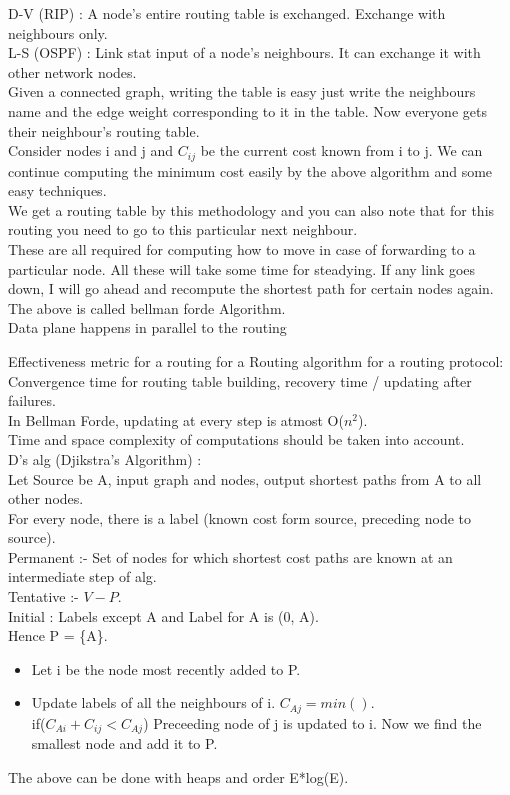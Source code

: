 \documentclass[solution,addpoints,12pt]{exam}
\begin{document}
D-V (RIP) : A node's entire routing table is exchanged. Exchange with
neighbours only.\\
L-S (OSPF) : Link stat input of a node's neighbours. It can exchange it
with other network nodes.\\
Given a connected graph, writing the table is easy
just write the neighbours name and the edge weight corresponding to
it in the table. Now everyone gets their neighbour's routing table.\\
Consider nodes i and j and $C_{ij}$ be the current cost known from i to j.
We can continue computing the minimum cost easily by the above algorithm
and some easy techniques.\\
We get a routing table by this methodology and you can also
note that for this routing you need to go to this particular next neighbour.\\
These are all required for computing how to move in case of forwarding to
a particular node. All these will take some time for steadying. If any link
goes down, I will go ahead and recompute the shortest path
for certain nodes again.\\

The above is called bellman forde Algorithm.\\
Data plane happens in parallel to the routing

Effectiveness metric for a routing for a Routing algorithm for
a routing protocol: Convergence time for routing table building,
recovery time / updating after failures.\\
In Bellman Forde, updating at every step is atmost O($n^2$).\\
Time and space complexity of computations should be taken into account.\\
D's alg (Djikstra's Algorithm) :\\
Let Source be A, input graph and nodes, output shortest paths
from A to all other nodes.\\
For every node, there is a label (known cost form source, preceding node
to source).\\
Permanent :- Set of nodes for which shortest cost paths are
known at an intermediate step of alg.\\
Tentative :- $V - P$.\\
Initial :
Labels except A and Label for A is (0, A).\\
Hence P = \{A\}.\\
\begin{itemize}
\item Let i be the node most recently added to P.
\item Update labels of all the neighbours of i.
$C_{Aj} = min()$.\\
if($ C_{Ai} + C_{ij} < C_{Aj}$) Preceeding node of j is updated to i.
Now we find the smallest node and add it to P.\\
\end{itemize}
The above can be done with heaps and order E*log(E).\\
\end{document}

